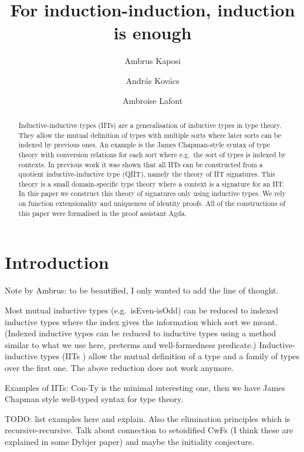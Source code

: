\documentclass[a4paper,UKenglish,cleveref, autoref]{lipics-v2019}
\title{For induction-induction, induction is enough} %
\author{Ambrus Kaposi}{E{\"o}tv{\"o}s Lor{\'a}nd University, Budapest, Hungary}{akaposi@inf.elte.hu}{https://orcid.org/0000-0001-9897-8936}{this author was supported by Thematic Excellence Programme, Industry and Digitization Subprogramme (NRDI Office, 2019) and by the European Union, co-financed by the European Social Fund (EFOP-3.6.2-16-2017-00013, Thematic Fundamental Research Collaborations Grounding Innovation in Informatics and Infocommunication).}%
\author{Andr{\'a}s Kov{\'a}cs}{E{\"o}tv{\"o}s Lor{\'a}nd University, Budapest, Hungary}{kovacsandras@inf.elte.hu}{https://orcid.org/0000-0002-6375-9781}{this author was supported by the European Union, co-financed by the European Social Fund (EFOP-3.6.3-VEKOP-16-2017-00002).}
\author{Ambroise Lafont}{IMT Atlantique, Inria, LS2N CNRS, Nantes, France}{ambroise.lafont@inria.fr}{https://orcid.org/0000-0002-9299-641X}{}
\begin{document}
\maketitle

\begin{abstract}
  Inductive-inductive types (IITs) are a generalisation of inductive
  types in type theory. They allow the mutual definition of types with
  multiple sorts where later sorts can be indexed by previous ones. An
  example is the James Chapman-style syntax of type theory with
  conversion relations for each sort where e.g.\ the sort of types is
  indexed by contexts.  In previous work it was shown that all IITs
  can be constructed from a quotient inductive-inductive type (QIIT),
  namely the theory of IIT signatures. This theory is a small
  domain-specific type theory where a context is a signature for an
  IIT. In this paper we construct this theory of signatures only using
  inductive types. We rely on function extensionality and uniqueness
  of identity proofs. All of the constructions of this paper were
  formalised in the proof assistant Agda.
\end{abstract}

\section{Introduction}
\label{sec:intro}

Note by Ambrus: to be beautified, I only wanted to add the line of
thought.

Most mutual inductive types (e.g.\ isEven-isOdd) can be reduced to
indexed inductive types where the index gives the information which
sort we meant. (Indexed inductive types can be reduced to inductive
types using a method similar to what we use here, preterms and
well-formedness predicate.) Inductive-inductive types (IITs
\cite{forsberg-phd}) allow the mutual definition of a type and a
family of types over the first one. The above reduction does not work
anymore.

Examples of IITs: Con-Ty is the minimal interesting one, then we have
James Chapman style \cite{chapman09eatitself} well-typed syntax for
type theory.

TODO: list examples here and explain. Also the elimination principles
which is recursive-recursive. Talk about connection to setoidified
CwFs (I think these are explained in some Dybjer paper) and maybe the
initiality conjecture.
\end{document}
